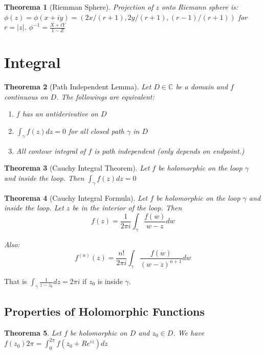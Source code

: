 \documentclass[12pt, a4paper]{article}
\newtheorem{theorem}{Theorema}[section]
\theoremstyle{definition}
\theoremstyle{remark}
\newcommand{\bb}[1]{\mathbb{#1}}
\begin{document}
\begin{theorem}[Riemman Sphere]
	Projection of $z$ onto Riemann sphere is: $\phi(z) = \phi(x + iy) = (2x/(r+1), 2y/(r+1), (r-1)/(r+1) )$ for $r = |z|$.
	$\phi^{-1} = \frac{X+iY}{1-Z}$
\end{theorem}

\section{Integral}

\begin{theorem}[Path Independent Lemma] 
Let $D \in \bb{C}$ be a domain and $f$ continuous on $D$. The followings are equivalent:

\begin{enumerate}
	\item $f$ has an antiderivative on $D$
	\item $\int_{\gamma} f(z) dz = 0$ for all closed path $\gamma$ in $D$
	\item All contour integral of $f$ is path independent (only depends on endpoint.)
\end{enumerate}

\end{theorem}

\begin{theorem}[Cauchy Integral Theorem]
	Let $f$ be holomorphic on the loop $\gamma$ and inside the loop. Then $\int_{\gamma} f(z) dz = 0$
\end{theorem}

\begin{theorem}[Cauchy Integral Formula]
	Let $f$ be holomorphic on the loop $\gamma$ and inside the loop. Let $z$ be in the interior of the loop.
	Then 
	$$f(z) = \frac{1}{2\pi i} \int_{\gamma} \frac{f(w)}{w - z} dw$$

	Also: 
	\[
	f^{(n)}(z) = \frac{n!}{2\pi i} \int_{\gamma} \frac{f(w)}{(w - z)^{n+1}} dw	
		\]

\end{theorem}
		That is $\int_{\gamma} \frac{1}{z-z_0} dz = 2\pi i$ if $z_0$ is inside $\gamma$.

\subsection{Properties of Holomorphic Functions}

\begin{theorem}
	Let $f$ be holomorphic on $D$ and $z_0 \in D$. We have $f(z_0) 2 \pi = \int_0^{2\pi} f(z_0 + Re^{iz}) dz $
\end{theorem}
\end{document}
